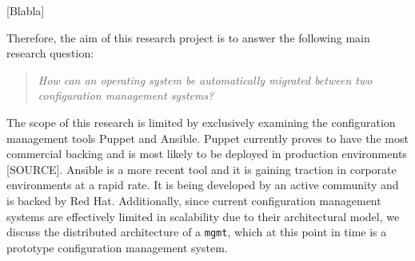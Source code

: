 [Blabla]

Therefore, the aim of this research project is to answer the following main research question:

\begin{quote}
\textit{How can an operating system be automatically migrated between two configuration management systems?}
\end{quote}

\noindent
The scope of this research is limited by exclusively examining the configuration management tools Puppet and Ansible. Puppet currently proves to have the most commercial backing and is most likely to be deployed in production environments [SOURCE]. Ansible is a more recent tool and it is gaining traction in corporate environments at a rapid rate. It is being developed by an active community and is backed by Red Hat. Additionally, since current configuration management systems are effectively limited in scalability due to their architectural model, we discuss the distributed architecture of a \texttt{mgmt}, which at this point in time is a prototype configuration management system.
